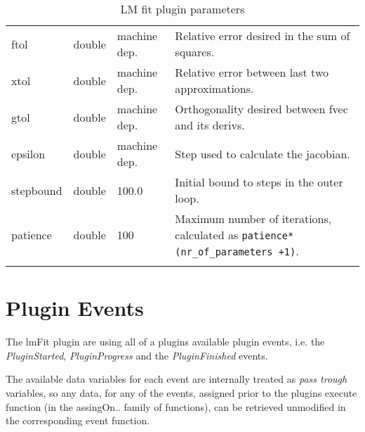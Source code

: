 \begin{landscape}
\begin{longtable}{p{4cm} l p{3cm}  p{10cm}}
ftol                            &   double              & machine dep.          &   Relative error desired in the sum of squares. \\
xtol                            &   double              & machine dep.          &   Relative error between last two approximations. \\
gtol                            &   double              & machine dep.          &   Orthogonality desired between fvec and its derivs. \\
epsilon                         &   double              & machine dep.          &   Step used to calculate the jacobian. \\
stepbound                       &   double              & 100.0                 &   Initial bound to steps in the outer loop. \\
patience                        &   double              & 100                   &   Maximum number of iterations, calculated as \verb|patience*(nr_of_parameters +1)|. \\
                                                        
\hline %
\caption{LM fit plugin parameters} 
\label{table:lmfitPluginParameters} 
\end{longtable}

\end{landscape}

\section{Plugin Events}
The lmFit plugin are using all of a plugins available plugin events, i.e. the \emph{PluginStarted}, \emph{PluginProgress} and the \emph{PluginFinished} events.

The available data variables for each event are internally treated as \emph{pass trough} variables, so any data, for any of the events, assigned prior to 
the plugins execute function (in the assingOn.. family of functions), can be retrieved unmodified in the corresponding event function.

